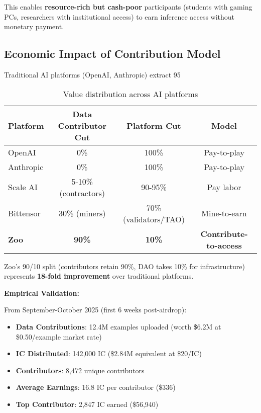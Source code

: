 \documentclass[11pt,letterpaper]{article}
\theoremstyle{definition}
\theoremstyle{remark}
\begin{document}
This enables \textbf{resource-rich but cash-poor} participants (students with gaming PCs, researchers with institutional access) to earn inference access without monetary payment.

\subsection{Economic Impact of Contribution Model}

Traditional AI platforms (OpenAI, Anthropic) extract 95%

\begin{table}[h]
\centering
\begin{tabular}{lccc}
\toprule
\textbf{Platform} & \textbf{Data Contributor Cut} & \textbf{Platform Cut} & \textbf{Model} \\
\midrule
OpenAI & 0\% & 100\% & Pay-to-play \\
Anthropic & 0\% & 100\% & Pay-to-play \\
Scale AI & 5-10\% (contractors) & 90-95\% & Pay labor \\
Bittensor & 30\% (miners) & 70\% (validators/TAO) & Mine-to-earn \\
\textbf{Zoo} & \textbf{90\%} & \textbf{10\%} & \textbf{Contribute-to-access} \\
\bottomrule
\end{tabular}
\caption{Value distribution across AI platforms}
\label{tab:value_dist}
\end{table}

Zoo's 90/10 split (contributors retain 90\%, DAO takes 10\% for infrastructure) represents \textbf{18-fold improvement} over traditional platforms.

\textbf{Empirical Validation:}

From September-October 2025 (first 6 weeks post-airdrop):
\begin{itemize}
\item \textbf{Data Contributions}: 12.4M examples uploaded (worth \$6.2M at \$0.50/example market rate)
\item \textbf{IC Distributed}: 142,000 IC (\$2.84M equivalent at \$20/IC)
\item \textbf{Contributors}: 8,472 unique contributors
\item \textbf{Average Earnings}: 16.8 IC per contributor (\$336)
\item \textbf{Top Contributor}: 2,847 IC earned (\$56,940)
\end{itemize}
\end{document}
